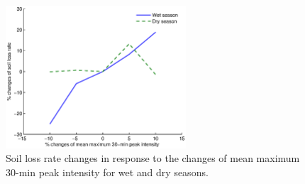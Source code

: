 \begin{figure}
  \centering
  \includegraphics[width=0.6\textwidth]{./img/future_sloss_change}
  \caption{Soil loss rate changes in response to the changes of mean
maximum 30-min peak intensity for wet and dry seasons.}
  \label{fig:future_sloss_change}
\end{figure}

